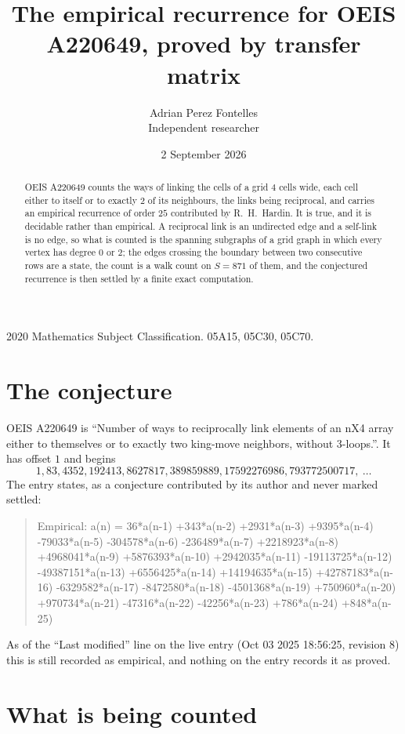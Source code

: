 \documentclass[11pt,a4paper]{article}
\title{The empirical recurrence for OEIS A220649, proved by transfer matrix}
\author{Adrian Perez Fontelles\\ \small Independent researcher}
\date{2 September 2026}
\theoremstyle{plain}
\theoremstyle{definition}
\begin{document}
\maketitle

\begin{abstract}
OEIS A220649 counts the ways of linking the cells of a grid $4$ cells wide, each cell either to
itself or to exactly $2$ of its neighbours, the links being reciprocal, and carries an
empirical recurrence of order $25$ contributed by R.~H.~Hardin. It is true, and it is
decidable rather than empirical. A reciprocal link is an undirected edge and a self-link is
no edge, so what is counted is the spanning subgraphs of a grid graph in which every vertex
has degree $0$ or $2$; the edges crossing the boundary between two consecutive rows are a
state, the count is a walk count on $S=871$ of them, and the conjectured recurrence is then
settled by a finite exact computation.
\end{abstract}

\noindent\small 2020 Mathematics Subject Classification. 05A15, 05C30, 05C70.\normalsize

\section{The conjecture}

OEIS A220649 is ``Number of ways to reciprocally link elements of an nX4 array either to themselves or to exactly two king-move neighbors, without 3-loops.''. It has offset $1$ and begins
\[
1, 83, 4352, 192413, 8627817, 389859889, 17592276986, 793772500717,\ \dots
\]
The entry states, as a conjecture contributed by its author and never marked settled:
\begin{quote}
Empirical: a(n) = 36*a(n-1) +343*a(n-2) +2931*a(n-3) +9395*a(n-4) -79033*a(n-5) -304578*a(n-6) -236489*a(n-7) +2218923*a(n-8) +4968041*a(n-9) +5876393*a(n-10) +2942035*a(n-11) -19113725*a(n-12) -49387151*a(n-13) +6556425*a(n-14) +14194635*a(n-15) +42787183*a(n-16) -6329582*a(n-17) -8472580*a(n-18) -4501368*a(n-19) +750960*a(n-20) +970734*a(n-21) -47316*a(n-22) -42256*a(n-23) +786*a(n-24) +848*a(n-25)
\end{quote}
As of the ``Last modified'' line on the live entry (Oct 03 2025 18:56:25, revision 8) this is still
recorded as empirical, and nothing on the entry records it as proved.

\section{What is being counted}
\end{document}
